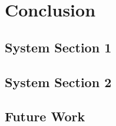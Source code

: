 %
\chapter{Conclusion}
\label{sec:conclusion}

\Blindtext[2][1]

\section{System Section 1}
\label{sec:conclusion:sec1}

\Blindtext[2][2]

\section{System Section 2}
\label{sec:conclusion:sec2}

\Blindtext[3][2]

\section{Future Work}
\label{sec:conclusion:future}

\Blindtext[2][2]
